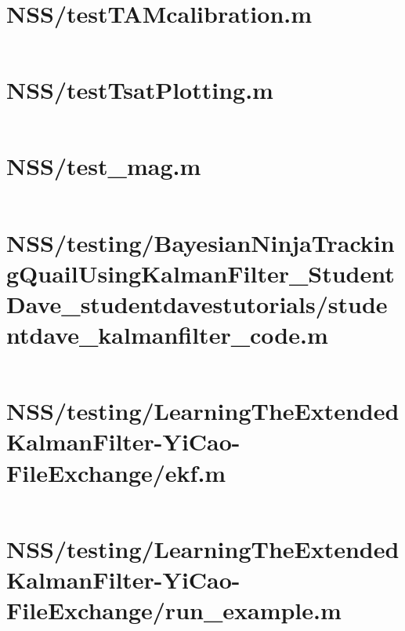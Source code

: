 \pagebreak
\section*{NSS/testTAMcalibration.m}\label{code:NSS/testTAMcalibration.m}
\inputminted[linenos,fontsize=\scriptsize]{matlab}{/home/dcouture/git/mathyourlife/TSatPy/beta_versions/matlab_object_oriented/testTAMcalibration.m}

\pagebreak
\section*{NSS/testTsatPlotting.m}\label{code:NSS/testTsatPlotting.m}
\inputminted[linenos,fontsize=\scriptsize]{matlab}{/home/dcouture/git/mathyourlife/TSatPy/beta_versions/matlab_object_oriented/testTsatPlotting.m}

\pagebreak
\section*{NSS/test\_mag.m}\label{code:NSS/test_mag.m}
\inputminted[linenos,fontsize=\scriptsize]{matlab}{/home/dcouture/git/mathyourlife/TSatPy/beta_versions/matlab_object_oriented/test_mag.m}

\pagebreak
\section*{NSS/testing/BayesianNinjaTrackingQuailUsingKalmanFilter\_StudentDave\_studentdavestutorials/studentdave\_kalmanfilter\_code.m}\label{code:NSS/testing/BayesianNinjaTrackingQuailUsingKalmanFilter_StudentDave_studentdavestutorials/studentdave_kalmanfilter_code.m}
\inputminted[linenos,fontsize=\scriptsize]{matlab}{/home/dcouture/git/mathyourlife/TSatPy/beta_versions/matlab_object_oriented/testing/BayesianNinjaTrackingQuailUsingKalmanFilter_StudentDave_studentdavestutorials/studentdave_kalmanfilter_code.m}

\pagebreak
\section*{NSS/testing/LearningTheExtendedKalmanFilter-YiCao-FileExchange/ekf.m}\label{code:NSS/testing/LearningTheExtendedKalmanFilter-YiCao-FileExchange/ekf.m}
\inputminted[linenos,fontsize=\scriptsize]{matlab}{/home/dcouture/git/mathyourlife/TSatPy/beta_versions/matlab_object_oriented/testing/LearningTheExtendedKalmanFilter-YiCao-FileExchange/ekf.m}

\pagebreak
\section*{NSS/testing/LearningTheExtendedKalmanFilter-YiCao-FileExchange/run\_example.m}\label{code:NSS/testing/LearningTheExtendedKalmanFilter-YiCao-FileExchange/run_example.m}
\inputminted[linenos,fontsize=\scriptsize]{matlab}{/home/dcouture/git/mathyourlife/TSatPy/beta_versions/matlab_object_oriented/testing/LearningTheExtendedKalmanFilter-YiCao-FileExchange/run_example.m}

